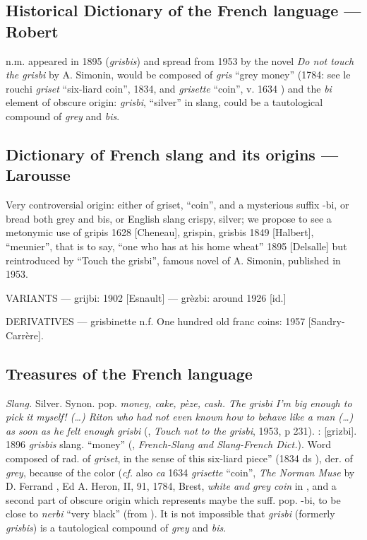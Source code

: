 \subsection*{Historical Dictionary of the French language --- Robert}

n.m. appeared in 1895 (\emph{grisbis}) and spread from 1953 by the novel \emph{Do not touch the grisbi} by A. Simonin, would be composed of \emph{gris} ``grey money'' (1784: see le rouchi \emph{griset} ``six-liard coin'', 1834, and \emph{grisette} ``coin'', v. 1634 ) and the \emph{bi} element of obscure origin: \emph{grisbi}, ``silver'' in slang, could be a tautological compound of \emph{grey} and \emph{bis}.

\subsection*{Dictionary of French slang and its origins --- Larousse}

Very controversial origin: either of griset, ``coin'', and a mysterious suffix -bi, or bread both grey and bis, or English slang crispy, silver; we propose to see a metonymic use of gripis 1628 [Cheneau], grispin, grisbis 1849 [Halbert], ``meunier'', that is to say, ``one who has at his home wheat'' 1895 [Delsalle] but reintroduced by ``Touch the grisbi'', famous novel of A. Simonin, published in 1953.

VARIANTS --- grijbi: 1902 [Esnault] --- grèzbi: around 1926 [id.]

DERIVATIVES --- grisbinette n.f. One hundred old franc coins: 1957 [Sandry-Carrère].

\subsection*{Treasures of the French language}

\emph{Slang.} Silver. Synon. pop. \emph{money, cake, pèze, cash. The grisbi I'm big enough to pick it myself! (\dots{}) Riton who had not even known how to behave like a man (\dots{}) as soon as he felt enough grisbi} (, \emph{Touch not to the grisbi}, 1953, p 231).
: [grizbi].  1896 \emph{grisbis}
slang. ``money'' (, \emph{French-Slang and Slang-French Dict.}). Word composed of rad. of \emph{griset}, in the sense of this six-liard piece'' (1834 ds ), der. of \emph{grey}, because of the color (\emph{cf.} also \emph{ca} 1634 \emph{grisette} ``coin'', \emph{The Norman Muse} by D. Ferrand , Ed A. Heron, II, 91, 1784, Brest, \emph{white and grey coin} in , and a second part of obscure origin which represents maybe the suff. pop. -bi, to be close to \emph{nerbi} ``very black'' (from ). It is not impossible that \emph{grisbi} (formerly \emph{grisbis}) is a tautological compound of \emph{grey} and \emph{bis}.

